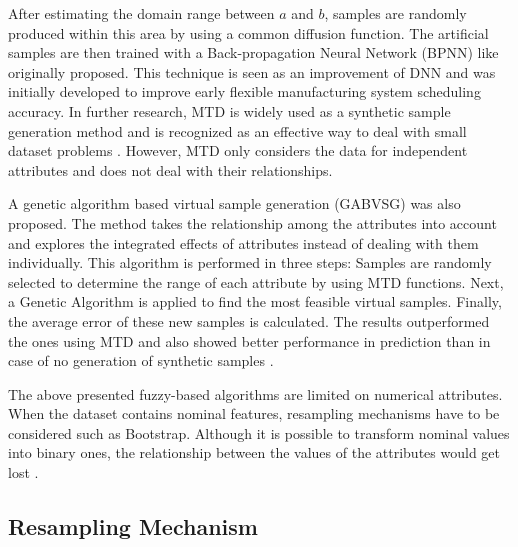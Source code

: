 \documentclass[parskip=full]{scrartcl}
\begin{document}
After estimating the domain range between $\mathit{a}$ and $\mathit{b}$, 
samples are randomly produced within this area by using a common diffusion 
function. The artificial samples are then trained with a Back-propagation 
Neural Network (BPNN) like \cite{Huang.2004} originally proposed. This 
technique is seen as an improvement of DNN and was initially developed to 
improve early flexible manufacturing system scheduling accuracy. In further 
research, MTD is widely used as a synthetic sample generation method and is 
recognized as an effective way to deal with small dataset problems 
\cite{AbdulLateh.2017}. However, MTD only considers the data for independent 
attributes and does not deal with their relationships. 

A genetic algorithm based virtual sample generation (GABVSG) was also proposed. 
The method takes the relationship among the attributes into account and 
explores the integrated effects of attributes instead of dealing with them 
individually. This algorithm is performed in three steps: Samples are randomly 
selected to determine the range of each attribute by using MTD functions. Next, 
a Genetic Algorithm is applied to find the most feasible virtual samples. 
Finally, the average error of these new samples is calculated. The results 
outperformed the ones using MTD and also showed better performance in 
prediction than in case of no generation of synthetic samples \cite{Li.2014}.

The above presented fuzzy-based algorithms are limited on numerical attributes. 
When the dataset contains nominal features, resampling mechanisms have to be 
considered such as Bootstrap. Although it is possible to transform nominal 
values into binary ones, the relationship between the values of the attributes 
would get lost \cite{Tsai.2008}. 

\subsection{Resampling Mechanism}
\end{document}
